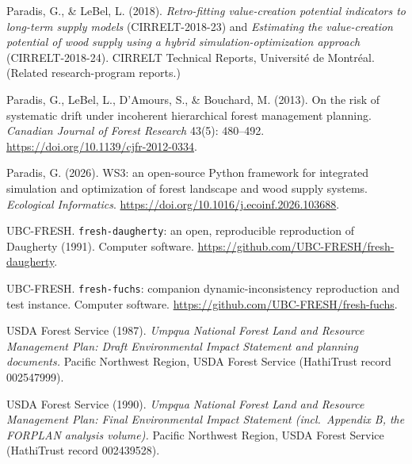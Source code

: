 \documentclass[12pt]{article}
\begin{document}
Paradis, G., \& LeBel, L. (2018). \emph{Retro-fitting value-creation potential indicators to long-term supply models} (CIRRELT-2018-23) and \emph{Estimating the value-creation potential of wood supply using a hybrid simulation-optimization approach} (CIRRELT-2018-24). CIRRELT Technical Reports, Université de Montréal. (Related research-program reports.)

Paradis, G., LeBel, L., D'Amours, S., \& Bouchard, M. (2013). On the risk of systematic drift under incoherent hierarchical forest management planning. \emph{Canadian Journal of Forest Research} 43(5): 480--492. \url{https://doi.org/10.1139/cjfr-2012-0334}.

Paradis, G. (2026). WS3: an open-source Python framework for integrated simulation and optimization of forest landscape and wood supply systems. \emph{Ecological Informatics}. \url{https://doi.org/10.1016/j.ecoinf.2026.103688}.

UBC-FRESH. \texttt{fresh-daugherty}: an open, reproducible reproduction of Daugherty (1991). Computer software. \url{https://github.com/UBC-FRESH/fresh-daugherty}.

UBC-FRESH. \texttt{fresh-fuchs}: companion dynamic-inconsistency reproduction and test instance. Computer software. \url{https://github.com/UBC-FRESH/fresh-fuchs}.

USDA Forest Service (1987). \emph{Umpqua National Forest Land and Resource Management Plan: Draft Environmental Impact Statement and planning documents.} Pacific Northwest Region, USDA Forest Service (HathiTrust record 002547999).

USDA Forest Service (1990). \emph{Umpqua National Forest Land and Resource Management Plan: Final Environmental Impact Statement (incl.~Appendix B, the FORPLAN analysis volume).} Pacific Northwest Region, USDA Forest Service (HathiTrust record 002439528).
\end{document}
